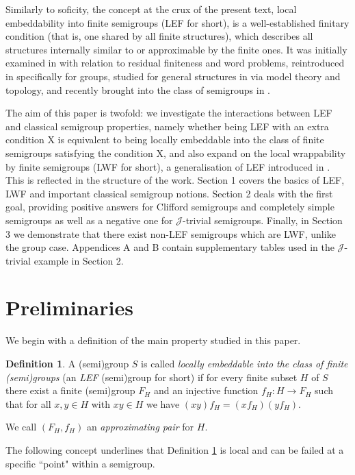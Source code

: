 \documentclass{article}
\theoremstyle{definition}
\newtheorem{definition}{Definition}
\def\J{\mathcal J}
\begin{document}
Similarly to soficity, the concept at the crux of the present text, local embeddability into finite semigroups (LEF for short), is a well-established finitary condition (that is, one shared by all finite structures), which describes all structures internally similar to or approximable by the finite ones. It was initially examined in \cite{Ev} with relation to residual finiteness and word problems, reintroduced in \cite{GV} specifically for groups, studied for general structures in \cite{Bel} via model theory and topology, and recently brought into the class of semigroups in \cite{K23, K24}.

The aim of this paper is twofold: we investigate the interactions between LEF and classical semigroup properties, namely whether being LEF with an extra condition X is equivalent to being locally embeddable into the class of finite semigroups satisfying the condition X, and also expand on the local wrappability by finite semigroups (LWF for short), a generalisation of LEF introduced in \cite{K24}. This is reflected in the structure of the work. Section 1 covers the basics of LEF, LWF and important classical semigroup notions. Section 2 deals with the first goal, providing positive answers for Clifford semigroups and completely simple semigroups as well as a negative one for $\J$-trivial semigroups. Finally, in Section 3 we demonstrate that there exist non-LEF semigroups which are LWF, unlike the group case. Appendices A and B contain supplementary tables used in the $\J$-trivial example in Section 2.

\section{Preliminaries}

We begin with a definition of the main property studied in this paper.

\begin{definition}\label{def_lef}
A (semi)group $S$ is called {\em locally embeddable into the class of finite (semi)groups} (an {\em LEF} (semi)group  for short) if for every finite subset $H$ of $S$ there exist a finite (semi)group $F_H$ and an injective function $f_H: H \rightarrow F_H$ such that for all  $x,y \in H$ with $xy \in H$ we have $(xy)f_H = (xf_H)(yf_H)$.

We call $(F_H, f_H)$ an {\em approximating pair} for $H$.
\end{definition}

The following concept underlines that Definition \ref{def_lef} is local and can be failed at a specific ``point" within a semigroup.
\end{document}
